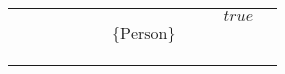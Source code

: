 \begin{table}[]
{\begin{tabular}{lllllllllll}
                          &                           &                   &                                                                          &                                                                        &                           &                                                             &                                                                            &                                                                           & \cellcolor[HTML]{FC8D59}$true$  &                                                                        \\
                          &                           &                   &                                                                          &                                                                        &                           & \cellcolor[HTML]{FC8D59}$\{\text{Person}\}$                 &                                                                            &                                                                           &                                 &                                                                        \\
                          &                           &                   &                                                                          &                                                                        &                           &                                                             &                                                                            & \cellcolor[HTML]{FC8D59}  &                                 &                                                                        \\
                          &                           &                   &                                                                          &                                                                        &                           &                                                             &                                                                            &                                                                           &                                 & \cellcolor[HTML]{FC8D59} \\
                          &                           &                   & \cellcolor[HTML]{FC8D59}   &                                                                        &                           &                                                             &                                                                            &                                                                           &                                 &                                                                        \\

\end{tabular}}
\end{table}
